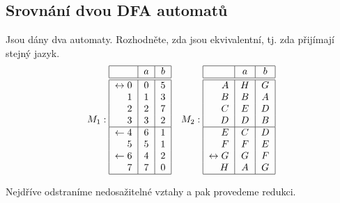 \subsection{Srovnání dvou DFA automatů}
Jsou dány dva automaty. Rozhodněte, zda jsou ekvivalentní, tj. zda přijímají stejný jazyk.
\[
M_1:
\begin{tabular}{|r|c|c|}
    \hline
    & $a$ & $b$\\
    \hline
    \hline
    $\leftrightarrow 0$& $0$ & $5$\\
    $1$                & $1$ & $3$\\
    $2$                & $2$ & $7$\\
    $3$                & $3$ & $2$\\
    \hline
    $\leftarrow 4$     & $6$ & $1$\\
    $5$                & $5$ & $1$\\
    $\leftarrow 6$     & $4$ & $2$\\
    $7$                & $7$ & $0$\\
    \hline
\end{tabular}
\quad
M_2:
\begin{tabular}{|r|c|c|}
    \hline
    & $a$ & $b$\\
    \hline
    \hline
    $A$                & $H$ & $G$\\
    $B$                & $B$ & $A$\\
    $C$                & $E$ & $D$\\
    $D$                & $D$ & $B$\\
    \hline
    $E$                & $C$ & $D$\\
    $F$                & $F$ & $E$\\
    $\leftrightarrow G$& $G$ & $F$\\
    $H$                & $A$ & $G$\\
    \hline
\end{tabular}
\]

Nejdříve odstraníme nedosažitelné vztahy a pak provedeme redukci.

